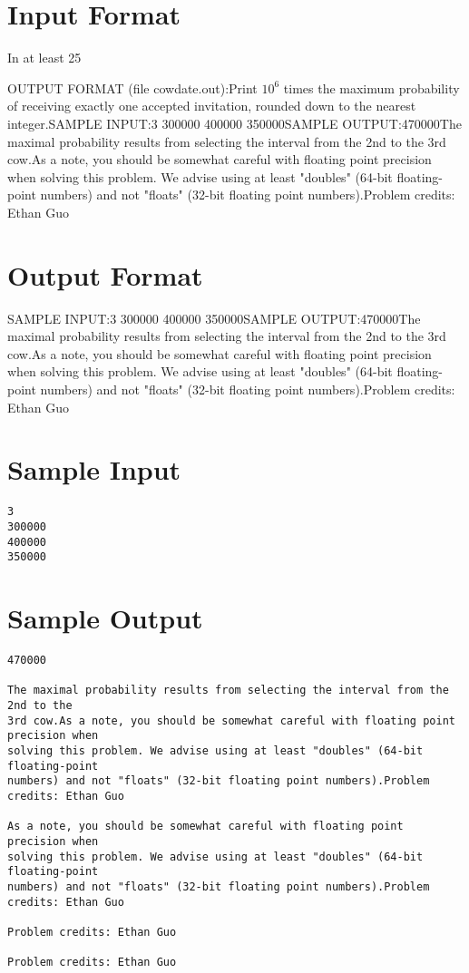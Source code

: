 \documentclass[12pt]{article}
\begin{document}
\section*{Input Format}
In at least 25%

OUTPUT FORMAT (file cowdate.out):Print $10^6$ times the maximum probability of receiving exactly one accepted
invitation, rounded down to the nearest integer.SAMPLE INPUT:3
300000
400000
350000SAMPLE OUTPUT:470000The maximal probability results from selecting the interval from the 2nd to the
3rd cow.As a note, you should be somewhat careful with floating point precision when
solving this problem. We advise using at least "doubles" (64-bit floating-point
numbers) and not "floats" (32-bit floating point numbers).Problem credits: Ethan Guo

\section*{Output Format}
SAMPLE INPUT:3
300000
400000
350000SAMPLE OUTPUT:470000The maximal probability results from selecting the interval from the 2nd to the
3rd cow.As a note, you should be somewhat careful with floating point precision when
solving this problem. We advise using at least "doubles" (64-bit floating-point
numbers) and not "floats" (32-bit floating point numbers).Problem credits: Ethan Guo

\section*{Sample Input}
\begin{verbatim}
3
300000
400000
350000
\end{verbatim}

\section*{Sample Output}
\begin{verbatim}
470000

The maximal probability results from selecting the interval from the 2nd to the
3rd cow.As a note, you should be somewhat careful with floating point precision when
solving this problem. We advise using at least "doubles" (64-bit floating-point
numbers) and not "floats" (32-bit floating point numbers).Problem credits: Ethan Guo

As a note, you should be somewhat careful with floating point precision when
solving this problem. We advise using at least "doubles" (64-bit floating-point
numbers) and not "floats" (32-bit floating point numbers).Problem credits: Ethan Guo

Problem credits: Ethan Guo

Problem credits: Ethan Guo
\end{verbatim}
\end{document}

